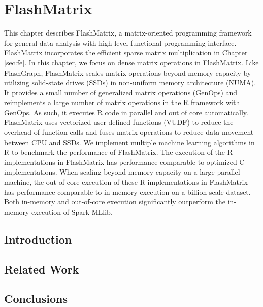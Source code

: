 \chapter{FlashMatrix}
\label{sec:fm}

This chapter describes FlashMatrix, a matrix-oriented programming framework
for general data analysis with high-level functional programming interface.
FlashMatrix incorporates the efficient sparse matrix multiplication in Chapter
\ref{sec:fe}. In this chapter, we focus on dense matrix operations in FlashMatrix.
Like FlashGraph, FlashMatrix scales matrix operations
beyond memory capacity by utilizing solid-state drives (SSDs) in non-uniform
memory architecture (NUMA). It provides a small number of generalized matrix
operations (GenOps) and reimplements a large number of matrix operations in
the R framework with GenOps. As such, it executes R code in parallel and out of
core automatically. FlashMatrix
uses vectorized user-defined functions (VUDF) to reduce the overhead of function
calls and fuses matrix operations to reduce data movement between CPU and
SSDs. We implement multiple machine learning algorithms in R to benchmark
the performance of FlashMatrix. The execution of the R implementations in
FlashMatrix has performance comparable to optimized C implementations.
When scaling beyond memory capacity on a large parallel machine, the out-of-core
execution of these R implementations in FlashMatrix has performance comparable
to in-memory execution on a billion-scale dataset. Both in-memory and
out-of-core execution significantly outperform the in-memory execution of
Spark MLlib.

\section{Introduction}


\section{Related Work}






\section{Conclusions}

